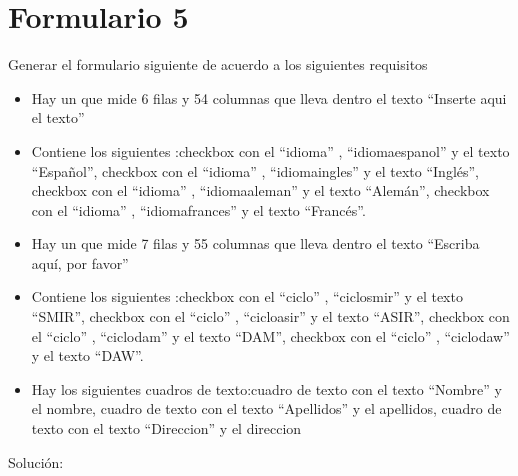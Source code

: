 \documentclass[letterpaper,10pt,spanish]{sphinxmanual}
\begin{document}
\section{Formulario 5}
\label{ejercicios/formularios/anexo_formularios:formulario-5}
Generar el formulario siguiente de acuerdo a los siguientes requisitos
\begin{itemize}
\item {} 
Hay un  que mide 6 filas y 54 columnas que lleva dentro el texto ``Inserte aqui el texto''

\item {} 
Contiene los siguientes :checkbox con el   ``idioma'' ,   ``idiomaespanol''  y el texto ``Español'', checkbox con el   ``idioma'' ,   ``idiomaingles''  y el texto ``Inglés'', checkbox con el   ``idioma'' ,   ``idiomaaleman''  y el texto ``Alemán'', checkbox con el   ``idioma'' ,   ``idiomafrances''  y el texto ``Francés''.

\item {} 
Hay un  que mide 7 filas y 55 columnas que lleva dentro el texto ``Escriba aquí, por favor''

\item {} 
Contiene los siguientes :checkbox con el   ``ciclo'' ,   ``ciclosmir''  y el texto ``SMIR'', checkbox con el   ``ciclo'' ,   ``cicloasir''  y el texto ``ASIR'', checkbox con el   ``ciclo'' ,   ``ciclodam''  y el texto ``DAM'', checkbox con el   ``ciclo'' ,   ``ciclodaw''  y el texto ``DAW''.

\item {} 
Hay los siguientes cuadros de texto:cuadro de texto con el texto ``Nombre'' y el  nombre, cuadro de texto con el texto ``Apellidos'' y el  apellidos, cuadro de texto con el texto ``Direccion'' y el  direccion

\end{itemize}


Solución:
\end{document}
